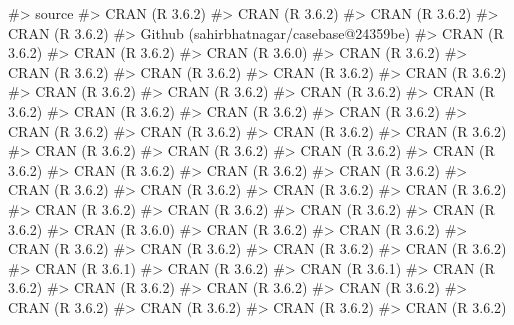 \documentclass[
]{jss}
\begin{document}
\begin{CodeChunk}
\begin{CodeOutput}
#>  source                                  
#>  CRAN (R 3.6.2)                          
#>  CRAN (R 3.6.2)                          
#>  CRAN (R 3.6.2)                          
#>  CRAN (R 3.6.2)                          
#>  Github (sahirbhatnagar/casebase@24359be)
#>  CRAN (R 3.6.2)                          
#>  CRAN (R 3.6.2)                          
#>  CRAN (R 3.6.0)                          
#>  CRAN (R 3.6.2)                          
#>  CRAN (R 3.6.2)                          
#>  CRAN (R 3.6.2)                          
#>  CRAN (R 3.6.2)                          
#>  CRAN (R 3.6.2)                          
#>  CRAN (R 3.6.2)                          
#>  CRAN (R 3.6.2)                          
#>  CRAN (R 3.6.2)                          
#>  CRAN (R 3.6.2)                          
#>  CRAN (R 3.6.2)                          
#>  CRAN (R 3.6.2)                          
#>  CRAN (R 3.6.2)                          
#>  CRAN (R 3.6.2)                          
#>  CRAN (R 3.6.2)                          
#>  CRAN (R 3.6.2)                          
#>  CRAN (R 3.6.2)                          
#>  CRAN (R 3.6.2)                          
#>  CRAN (R 3.6.2)                          
#>  CRAN (R 3.6.2)                          
#>  CRAN (R 3.6.2)                          
#>  CRAN (R 3.6.2)                          
#>  CRAN (R 3.6.2)                          
#>  CRAN (R 3.6.2)                          
#>  CRAN (R 3.6.2)                          
#>  CRAN (R 3.6.2)                          
#>  CRAN (R 3.6.2)                          
#>  CRAN (R 3.6.2)                          
#>  CRAN (R 3.6.2)                          
#>  CRAN (R 3.6.2)                          
#>  CRAN (R 3.6.2)                          
#>  CRAN (R 3.6.2)                          
#>  CRAN (R 3.6.0)                          
#>  CRAN (R 3.6.2)                          
#>  CRAN (R 3.6.2)                          
#>  CRAN (R 3.6.2)                          
#>  CRAN (R 3.6.2)                          
#>  CRAN (R 3.6.2)                          
#>  CRAN (R 3.6.2)                          
#>  CRAN (R 3.6.1)                          
#>  CRAN (R 3.6.2)                          
#>  CRAN (R 3.6.1)                          
#>  CRAN (R 3.6.2)                          
#>  CRAN (R 3.6.2)                          
#>  CRAN (R 3.6.2)                          
#>  CRAN (R 3.6.2)                          
#>  CRAN (R 3.6.2)                          
#>  CRAN (R 3.6.2)                          
#>  CRAN (R 3.6.2)                          
#>  CRAN (R 3.6.2)                          

\end{CodeOutput}
\end{CodeChunk}
\end{document}
